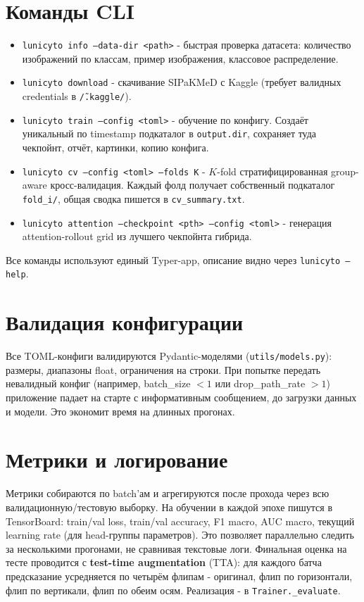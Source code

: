\documentclass[14pt,a4paper]{extreport}
\begin{document}
\section{Команды CLI}

\begin{itemize}
    \item \texttt{lunicyto info --data-dir <path>} - быстрая проверка
          датасета: количество изображений по классам, пример
          изображения, классовое распределение.
    \item \texttt{lunicyto download} - скачивание SIPaKMeD с Kaggle
          (требует валидных credentials в \texttt{\~/.kaggle/}).
    \item \texttt{lunicyto train --config <toml>} - обучение по
          конфигу. Создаёт уникальный по timestamp подкаталог в
          \texttt{output.dir}, сохраняет туда чекпойнт, отчёт,
          картинки, копию конфига.
    \item \texttt{lunicyto cv --config <toml> --folds K} - $K$-fold
          стратифицированная group-aware кросс-валидация. Каждый фолд
          получает собственный подкаталог \texttt{fold\_i/}, общая
          сводка пишется в \texttt{cv\_summary.txt}.
    \item \texttt{lunicyto attention --checkpoint <pth> --config <toml>}
          - генерация attention-rollout grid из лучшего чекпойнта
          гибрида.
\end{itemize}

Все команды используют единый Typer-app, описание видно через
\texttt{lunicyto --help}.

\section{Валидация конфигурации}

Все TOML-конфиги валидируются Pydantic-моделями
(\texttt{utils/models.py}): размеры, диапазоны float, ограничения на
строки. При попытке передать невалидный конфиг (например, batch\_size
$< 1$ или drop\_path\_rate $> 1$) приложение падает на старте с
информативным сообщением, до загрузки данных и модели. Это экономит
время на длинных прогонах.

\section{Метрики и логирование}

Метрики собираются по batch'ам и агрегируются после прохода через всю
валидационную/тестовую выборку. На обучении в каждой эпохе пишутся в
TensorBoard: train/val loss, train/val accuracy, F1 macro, AUC macro,
текущий learning rate (для head-группы параметров). Это позволяет
параллельно следить за несколькими прогонами, не сравнивая текстовые
логи. Финальная оценка на тесте проводится с
\textbf{test-time augmentation} (TTA): для каждого батча предсказание
усредняется по четырём флипам - оригинал, флип по горизонтали, флип
по вертикали, флип по обеим осям. Реализация - в
\texttt{Trainer.\_evaluate}.
\end{document}
